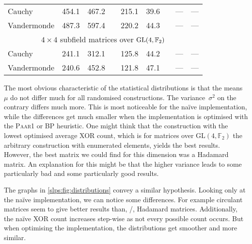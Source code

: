 \begin{table}
\begin{sidecaption}
\begin{threeparttable}
\begin{tabular}{lrrcrrcrr}
        \midrule
        Cauchy            & 454.1 &  467.2   & & 215.1 &   39.6  & & ---  &   ---    \\
        Vandermonde       & 487.3 &  597.4   & & 220.2 &   44.3  & & ---  &   ---    \\
        \bottomrule
        \toprule
        \multicolumn{9}{c}{$4 \times 4$ subfield matrices over $\mathrm{GL}(4, \mathbb{F}_2)$}             \\ \rowcolor{gray!10}
        \midrule
        Cauchy            & 241.1 &  312.1   & & 125.8 &   44.2  & & ---  &   ---    \\
        Vandermonde       & 240.6 &  452.8   & & 121.8 &   47.1  & & ---  &   ---    \\
        \bottomrule
    \end{tabular}
    \end{threeparttable}
    \end{sidecaption}
\end{table}

The most obvious characteristic of the statistical distributions is that the means~$\mu$ do not differ much for all randomised constructions.
The variance~$\sigma^2$ on the contrary differs much more.
This is most noticeable for the na\"ive implementation, while the differences get much smaller when the implementation is optimised with the \textsc{Paar1} or \textsc{BP} heuristic.
One might think that the construction with the lowest optimised average XOR count, which is for matrices over $\mathrm{GL}(4, \mathbb{F}_2)$ the arbitrary construction with enumerated elements, yields the best results.
However, the best matrix we could find for this dimension was a Hadamard matrix.
An explanation for this might be that the higher variance leads to some particularly bad and some particularly good results.

The graphs in \cref{slps:fig:distributions} convey a similar hypothesis.
Looking only at the na\"ive implementation, we can notice some differences.
For example circulant matrices seem to give better results than, \eg/, Hadamard matrices.
Additionally, the na\"ive XOR count increases step-wise as not every possible count occurs.
But when optimising the implementation, the distributions get smoother and more similar.

